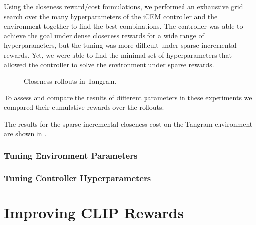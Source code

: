 Using the closeness reward/cost formulations, we performed an exhaustive grid search over the many hyperparameters of the iCEM controller and the environment together to find the best combinations.
The controller was able to achieve the goal under dense closeness rewards for a wide range of hyperparameters, but the tuning was more difficult under sparse incremental rewards.
Yet, we were able to find the minimal set of hyperparameters that allowed the controller to solve the environment under sparse rewards.

\begin{figure}[H]
    \centering
    \caption{Closeness rollouts in Tangram.}
    \label{fig:closeness-rollouts}
\end{figure}

To assess and compare the results of different parameters in these experiments we compared their cumulative rewards over the rollouts.

The results for the sparse incremental closeness cost on the Tangram environment are shown in .

\subsubsection{Tuning Environment Parameters}
\label{sec:env-hyperparameters}

\label{sec:sgw-hyperparameters}


\label{sec:tangram-hyperparameters}


\subsubsection{Tuning Controller Hyperparameters}
\label{sec:icem-hyperparameters}



\section{Improving CLIP Rewards}
\label{sec:improving-rewards}

